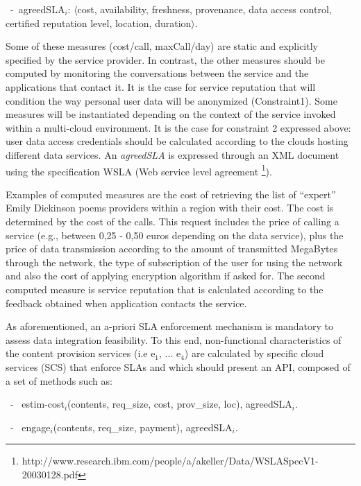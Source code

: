 
\begin{trivlist}\sf\footnotesize
\item[~-~agreedSLA$_i$:] $\langle$cost, availability, freshness, provenance, data access control, certified reputation level, location, duration$\rangle$. 
 \end{trivlist}
 
Some of these measures ({cost/call, maxCall/day}) are static and explicitly specified by the service provider. 
In contrast, the other measures should be computed by monitoring the conversations between the service and the applications that contact it.  It is the case for service reputation that will condition the way personal user data will be anonymized (Constraint1).  Some measures will be instantiated depending on the context of  the service invoked within a multi-cloud environment. It is the case for constraint 2 expressed above:   user data access credentials should be calculated according to the clouds hosting different data services.
An \textit{agreedSLA} is expressed through an  XML document using the specification WSLA (Web service level agreement \footnote{\footnotesize http://www.research.ibm.com/people/a/akeller/\-Data/WSLASpecV1-20030128.pdf}).

Examples of computed measures are the cost of retrieving the list of ``expert'' Emily Dickinson poems providers within a region with their cost. 
The cost is determined by the  cost of the calls. 
This request  includes the price of calling a service (e.g.,  between 0,25 - 0,50 euros depending on the data service), plus the price of data transmission according to the amount of transmitted MegaBytes through the network, the type of subscription of the user for using the network and also the cost of applying encryption algorithm if asked for. The second computed measure is service reputation that is calculated according to the feedback obtained when application contacts the service.




As aforementioned, an a-priori SLA enforcement mechanism is mandatory to assess data integration feasibility.
To this end, non-functional characteristics of the content provision services ({i.e e$_1$, ... e$_4$}) are calculated by specific cloud services (SCS) that enforce SLAs  and which should present an API, composed of a set of methods such as:

 
\begin{trivlist}\sf\footnotesize
\item[~-~]estim-cost$_i$(contents, req\_size, cost, prov\_size, loc), 
agreedSLA$_i$.

\item[~-~]engage$_i$(contents, req\_size, payment), agreedSLA$_i$.
\end{trivlist}

